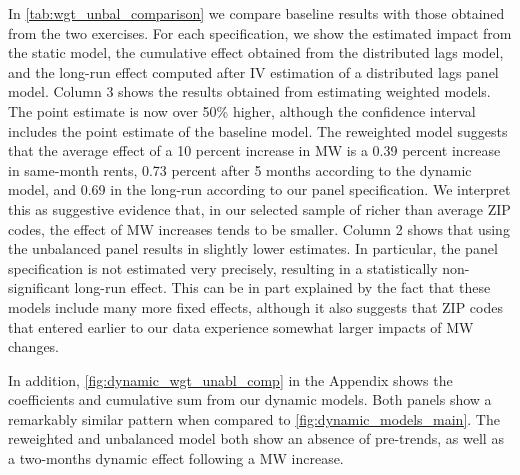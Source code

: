 In \autoref{tab:wgt_unbal_comparison} we compare baseline results with those obtained from the 
two exercises. For each specification, we show the estimated impact from the static model, the 
cumulative effect obtained from the distributed lags model, and the long-run effect computed after
IV estimation of a distributed lags panel model. Column 3 shows the results obtained from 
estimating weighted models. The point estimate is now over 50\% higher, although the confidence 
interval includes the point estimate of the baseline model. The reweighted model suggests that the 
average effect of a 10 percent increase in MW is a 0.39 percent increase in same-month rents, 0.73 
percent after 5 months according to the dynamic model, and 0.69 in the long-run according to our 
panel specification. We interpret this as suggestive evidence that, in our selected sample of 
richer than average ZIP codes, the effect of MW increases tends to be smaller. Column 2 shows that 
using the unbalanced panel results in slightly lower estimates. In particular, the panel 
specification is not estimated very precisely, resulting in a statistically non-significant 
long-run effect. This can be in part explained by the fact that these models include many more 
fixed effects, although it also suggests that ZIP codes that entered earlier to our data experience 
somewhat larger impacts of MW changes.

In addition, \autoref{fig:dynamic_wgt_unabl_comp} in the Appendix shows the coefficients and 
cumulative sum from our dynamic models. Both panels show a remarkably similar pattern when compared 
to \autoref{fig:dynamic_models_main}. The reweighted and unbalanced model both show an absence of 
pre-trends, as well as a two-months dynamic effect following a MW increase.


